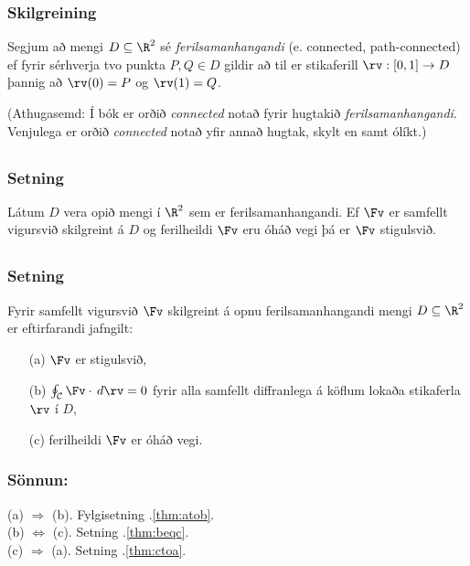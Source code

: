 \subsubsection{Skilgreining \rtask{}}
   Segjum að mengi $D\subseteq \R^2$ sé {\em
  ferilsamanhangandi} (e. connected, path-connected)  ef fyrir
  sérhverja tvo punkta $P, Q\in D$ gildir 
að til er stikaferill $\rv:[0,1]\rightarrow D$ þannig að $\rv(0)=P$ og
$\rv(1)=Q$.

\bigskip
(Athugasemd:  Í bók er orðið {\em connected} notað fyrir hugtakið {\em
  ferilsamanhangandi}.  Venjulega er orðið {\em connected} notað yfir
  annað hugtak, skylt en samt ólíkt.)






\subsection{} 

\subsubsection{ Setning  }
 Látum $D$ vera opið mengi í $\R^2$ sem er ferilsamanhangandi.  Ef $\Fv$ er samfellt vigursvið skilgreint á $D$ og ferilheildi $\Fv$ eru óháð vegi þá er $\Fv$ stigulsvið.
    






\subsection{} 

\subsubsection{Setning \rtask{}}
 Fyrir samfellt vigursvið $\Fv$ skilgreint á opnu 
ferilsamanhangandi mengi $D\subseteq \R^2$ er eftirfarandi jafngilt:
\begin{itemize}
 \item [(a)] $\Fv$ er stigulsvið,
 \item [(b)]  $\oint_{\cal C} \Fv\cdot\,d\rv=0$ fyrir alla samfellt diffranlega
á köflum lokaða stikaferla $\rv$ í $D$, 
\item [(c)] ferilheildi $\Fv$ er óháð vegi.
\end{itemize}

\pause
\subsubsection{Sönnun: } 
(a) $\Rightarrow$ (b). Fylgisetning \kaflanr.\ref{thm:atob}. \\
(b) $\Leftrightarrow$ (c). Setning \kaflanr.\ref{thm:beqc}. \\
(c) $\Rightarrow$ (a). Setning \kaflanr.\ref{thm:ctoa}.
 




